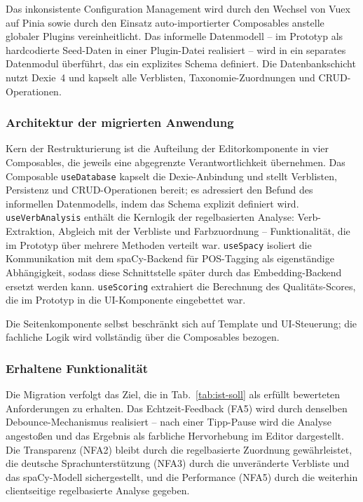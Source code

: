 Das inkonsistente Configuration Management wird durch den Wechsel von Vuex auf Pinia sowie durch den Einsatz auto-importierter Composables anstelle globaler Plugins vereinheitlicht.
Das informelle Datenmodell -- im Prototyp als hardcodierte Seed-Daten in einer Plugin-Datei realisiert -- wird in ein separates Datenmodul überführt, das ein explizites Schema definiert.
Die Datenbankschicht nutzt Dexie~4 und kapselt alle Verblisten, Taxonomie-Zuordnungen und CRUD-Operationen.

\subsubsection{Architektur der migrierten Anwendung}\label{sec:architektur-migration}

Kern der Restrukturierung ist die Aufteilung der Editorkomponente in vier Composables, die jeweils eine abgegrenzte Verantwortlichkeit übernehmen.
Das Composable \texttt{useDatabase} kapselt die Dexie-Anbindung und stellt Verblisten, Persistenz und CRUD-Operationen bereit; es adressiert den Befund des informellen Datenmodells, indem das Schema explizit definiert wird.
\texttt{useVerbAnalysis} enthält die Kernlogik der regelbasierten Analyse: Verb-Extraktion, Abgleich mit der Verbliste und Farbzuordnung -- Funktionalität, die im Prototyp über mehrere Methoden verteilt war.
\texttt{useSpacy} isoliert die Kommunikation mit dem spaCy-Backend für POS-Tagging als eigenständige Abhängigkeit, sodass diese Schnittstelle später durch das Embedding-Backend ersetzt werden kann.
\texttt{useScoring} extrahiert die Berechnung des Qualitäts-Scores, die im Prototyp in die UI-Komponente eingebettet war.

Die Seitenkomponente selbst beschränkt sich auf Template und UI-Steuerung; die fachliche Logik wird vollständig über die Composables bezogen.

\subsubsection{Erhaltene Funktionalität}\label{sec:erhaltene-funktionalitaet}

Die Migration verfolgt das Ziel, die in Tab.~\ref{tab:ist-soll} als erfüllt bewerteten Anforderungen zu erhalten.
Das Echtzeit-Feedback (FA5) wird durch denselben Debounce-Mechanismus realisiert -- nach einer Tipp-Pause wird die Analyse angestoßen und das Ergebnis als farbliche Hervorhebung im Editor dargestellt.
Die Transparenz (NFA2) bleibt durch die regelbasierte Zuordnung gewährleistet, die deutsche Sprachunterstützung (NFA3) durch die unveränderte Verbliste und das spaCy-Modell sichergestellt, und die Performance (NFA5) durch die weiterhin clientseitige regelbasierte Analyse gegeben.

